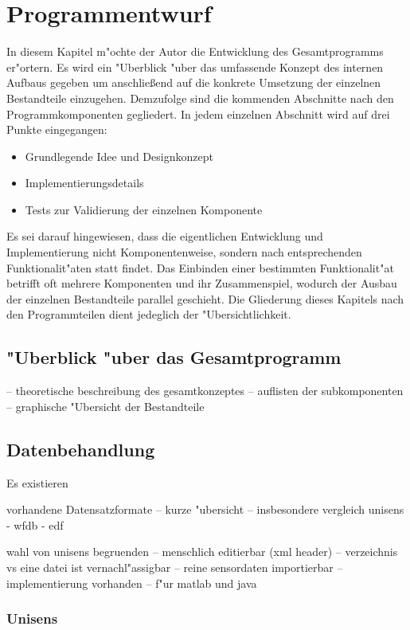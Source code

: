 \chapter{Programmentwurf}

In diesem Kapitel m"ochte der Autor die Entwicklung des Gesamtprogramms er"ortern.
Es wird ein "Uberblick "uber das umfassende Konzept des internen Aufbaus gegeben um anschlie\ss end auf die konkrete Umsetzung der einzelnen Bestandteile einzugehen.
Demzufolge sind die kommenden Abschnitte nach den Programmkomponenten gegliedert.
In jedem einzelnen Abschnitt wird auf drei Punkte eingegangen:
\begin{itemize}
	\item Grundlegende Idee und Designkonzept
	\item Implementierungsdetails
	\item Tests zur Validierung der einzelnen Komponente
\end{itemize}
Es sei darauf hingewiesen, dass die eigentlichen Entwicklung und Implementierung nicht Komponentenweise, sondern nach entsprechenden Funktionalit"aten statt findet.
Das Einbinden einer bestimmten Funktionalit"at betrifft oft mehrere Komponenten und ihr Zusammenspiel, wodurch der Ausbau der einzelnen Bestandteile parallel geschieht.
Die Gliederung dieses Kapitels nach den Programmteilen dient jedeglich der "Ubersichtlichkeit.

\section{"Uberblick "uber das Gesamtprogramm}

-- theoretische beschreibung des gesamtkonzeptes
-- auflisten der subkomponenten
-- graphische "Ubersicht der Bestandteile

\section{Datenbehandlung}

Es existieren \cite{Schlogl2009}

vorhandene Datensatzformate
	-- kurze "ubersicht
	-- insbesondere vergleich unisens - wfdb - edf

wahl von unisens begruenden
	-- menschlich editierbar (xml header)
	-- verzeichnis vs eine datei ist vernachl"assigbar
	-- reine sensordaten importierbar
	-- implementierung vorhanden
	-- f"ur matlab und java

\subsection{Unisens}

